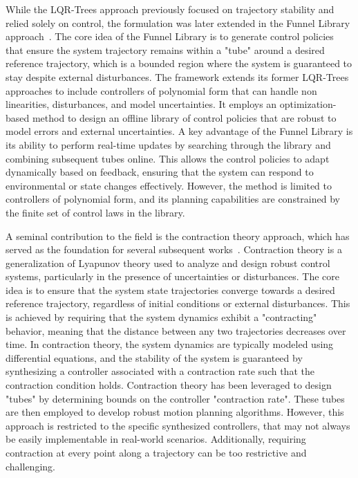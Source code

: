 While the LQR-Trees approach previously focused on trajectory stability and relied solely on  control, the formulation was later extended in the Funnel Library approach~\cite{cMajundarLibrary}.
The core idea of the Funnel Library is to generate control policies that ensure the system trajectory remains within a "tube" around a desired reference trajectory, which is a bounded region where the system is guaranteed to stay despite external disturbances.
The framework extends its former LQR-Trees approaches to include controllers of polynomial form that can handle non linearities, disturbances, and model uncertainties.
It employs an optimization-based method to design an offline library of control policies that are robust to model errors and external uncertainties. 
A key advantage of the Funnel Library is its ability to perform real-time updates by searching through the library and combining subsequent tubes online. 
This allows the control policies to adapt dynamically based on feedback, ensuring that the system can respond to environmental or state changes effectively.
However, the method is limited to controllers of polynomial form, and its planning capabilities are constrained by the finite set of control laws in the library.

A seminal contribution to the field is the contraction theory approach, which has served as the foundation for several subsequent works~\cite{cContractThControl,cContractThControlLearning,cContractThMP,cContractThOnlineMP}.
Contraction theory is a generalization of Lyapunov theory used to analyze and design robust control systems, particularly in the presence of uncertainties or disturbances. 
The core idea is to ensure that the system state trajectories converge towards a desired reference trajectory, regardless of initial conditions or external disturbances. 
This is achieved by requiring that the system dynamics exhibit a "contracting" behavior, meaning that the distance between any two trajectories decreases over time. 
In contraction theory, the system dynamics are typically modeled using differential equations, and the stability of the system is guaranteed by synthesizing a controller associated with a contraction rate such that the contraction condition holds. 
Contraction theory has been leveraged to design "tubes" by determining bounds on the controller "contraction rate". 
These tubes are then employed to develop robust motion planning algorithms. 
However, this approach is restricted to the specific synthesized controllers, that may not always be easily implementable in real-world scenarios. 
Additionally, requiring contraction at every point along a trajectory can be too restrictive and challenging.

